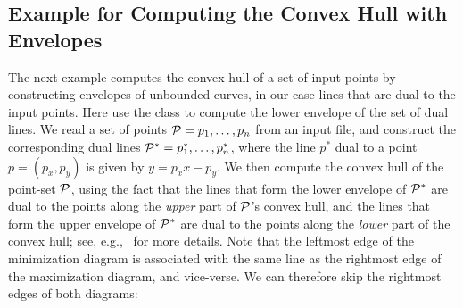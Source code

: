 
\subsection{Example for Computing the Convex Hull with Envelopes}

The next example computes the convex hull of a set of input points
by constructing envelopes of unbounded curves, in our case lines
that are dual to the input points. Here use the
 class to compute the lower envelope of the
set of dual lines. We read a set of points ${\cal P} = p_1, \ldots, p_n$
from an input file, and construct the corresponding dual lines
${\cal P}^{*} = p^{*}_1, \ldots, p^{*}_n$, where the line $p^{*}$ dual
to a point $p = (p_x, p_y)$ is given by $y = p_x x - p_y$. We then
compute the convex hull of the point-set ${\cal P}$, using the fact that
the lines that form the lower envelope of ${\cal P}^{*}$ are dual to the
points along the {\em upper} part of ${\cal P}$'s convex hull, and the
lines that form the upper envelope of ${\cal P}^{*}$ are dual to the
points along the {\em lower} part of the convex hull; see,
e.g.,~\cite[Section~11.4]{bkos-cgaa-00} for more details.
Note that the leftmost edge of the minimization diagram is associated
with the same line as the rightmost edge of the maximization diagram,
and vice-verse. We can therefore skip the rightmost edges of both
diagrams:


